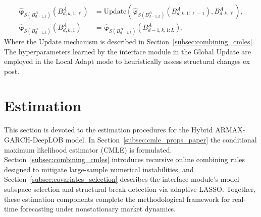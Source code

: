 \documentclass[10pt,a4paper,oneside]{article}
\begin{document}
\begin{align*}
    \hat{\boldsymbol{\varphi}}_{S(B^B_{d-1,k})}\left(B^A_{d,k,1:\ell} \right) &= \mathrm{Update}\left(\hat{\boldsymbol{\varphi}}_{S(B^B_{d-1,k})}\left(B^A_{d,k,1:\ell-1} \right), B^A_{d,k,\ell}\right),\\
    \hat{\boldsymbol{\varphi}}_{S(B^B_{d-1,k})}\left(B^A_{d,k,1} \right) &= \hat{\boldsymbol{\varphi}}_{S(B^B_{d-1,k})}\left(B^A_{d - 1,k,1:L} \right).
\end{align*}
Where the $\mathrm{Update}$ mechanism is described in Section~\ref{subsec:combining_cmles}. The hyperparameters learned by the interface module in the Global Update are employed in the Local Adapt mode to heuristically assess structural changes ex post.



\section{Estimation}
\label{Sect:Estimation}
This section is devoted to the estimation procedures for the Hybrid ARMAX-GARCH-DeepLOB model.  In Section~\ref{subsec:cmle_props_paper} the conditional maximum likelihood estimator (CMLE) is formulated.  Section~\ref{subsec:combining_cmles} introduces recursive online combining rules designed to mitigate large-sample numerical instabilities, and Section~\ref{subsec:covariates_selection} describes the interface module’s model subspace selection and structural break detection via adaptive LASSO.  Together, these estimation components complete the methodological framework for real-time forecasting under nonstationary market dynamics.
\end{document}
